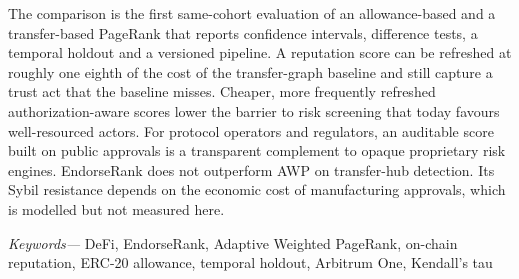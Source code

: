 The comparison is the first same-cohort evaluation of an allowance-based and a transfer-based PageRank that reports confidence intervals, difference tests, a temporal holdout and a versioned pipeline. A reputation score can be refreshed at roughly one eighth of the cost of the transfer-graph baseline and still capture a trust act that the baseline misses. Cheaper, more frequently refreshed authorization-aware scores lower the barrier to risk screening that today favours well-resourced actors. For protocol operators and regulators, an auditable score built on public approvals is a transparent complement to opaque proprietary risk engines. EndorseRank does not outperform AWP on transfer-hub detection. Its Sybil resistance depends on the economic cost of manufacturing approvals, which is modelled but not measured here.

\emph{Keywords---} DeFi, EndorseRank, Adaptive Weighted PageRank, on-chain reputation, ERC-20 allowance, temporal holdout, Arbitrum One, Kendall's tau
